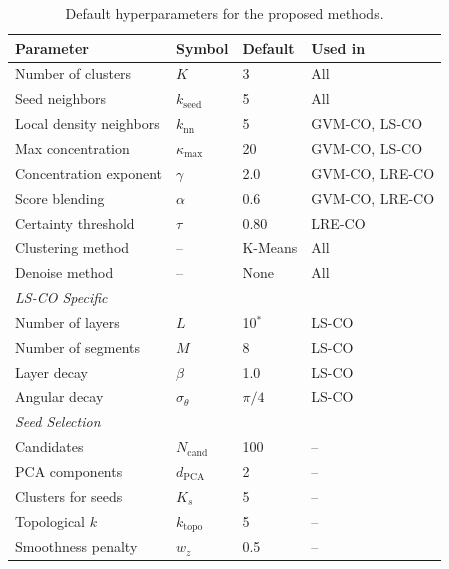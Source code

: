 \begin{table}[H]
\centering
\caption{Default hyperparameters for the proposed methods.}
\label{tab:setup:hyperparams}
\begin{tabular}{llll}
\toprule
\textbf{Parameter} & \textbf{Symbol} & \textbf{Default} & \textbf{Used in} \\
\midrule
Number of clusters        & $K$               & 3    & All \\
Seed neighbors           & $k_{\text{seed}}$  & 5    & All \\
Local density neighbors  & $k_{\text{nn}}$   & 5    & GVM-CO, LS-CO \\
Max concentration         & $\kappa_{\max}$   & 20   & GVM-CO, LS-CO \\
Concentration exponent    & $\gamma$          & 2.0  & GVM-CO, LRE-CO \\
Score blending            & $\alpha$          & 0.6  & GVM-CO, LRE-CO \\
Certainty threshold       & $\tau$            & 0.80 & LRE-CO \\
Clustering method         & --                & K-Means & All \\
Denoise method            & --                & None & All \\
\midrule
\multicolumn{4}{l}{\textit{LS-CO Specific}} \\
\midrule
Number of layers          & $L$               & 10$^*$ & LS-CO \\
Number of segments        & $M$               & 8    & LS-CO \\
Layer decay               & $\beta$           & 1.0  & LS-CO \\
Angular decay             & $\sigma_\theta$   & $\pi/4$ & LS-CO \\
\midrule
\multicolumn{4}{l}{\textit{Seed Selection}} \\
\midrule
Candidates                & $N_{\text{cand}}$  & 100  & -- \\
PCA components            & $d_{\text{PCA}}$  & 2    & -- \\
Clusters for seeds        & $K_s$             & 5    & -- \\
Topological $k$           & $k_{\text{topo}}$ & 5    & -- \\
Smoothness penalty        & $w_z$             & 0.5  & -- \\
\bottomrule
\end{tabular}
\end{table}

